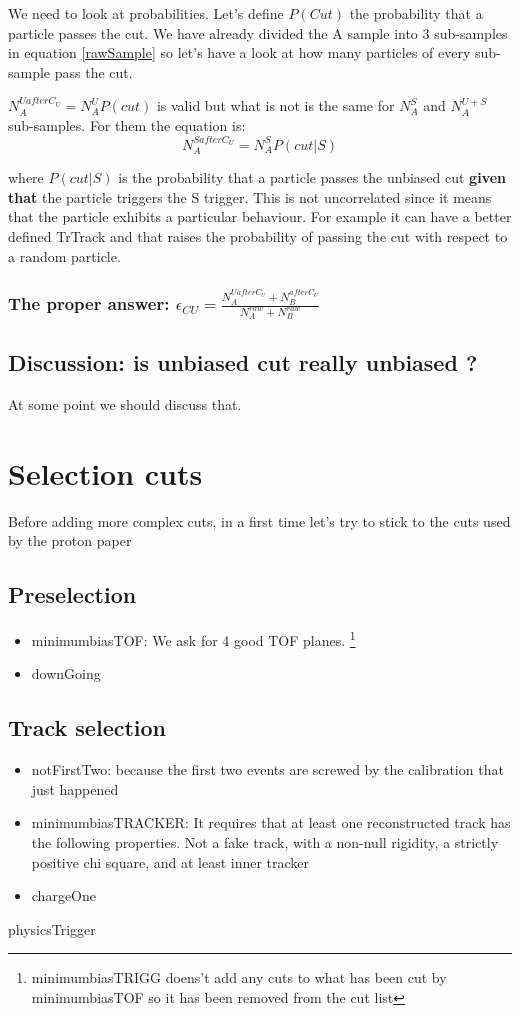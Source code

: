 \documentclass[fleqn,twoside]{article}
\begin{document}
We need to look at probabilities. Let's define $P(Cut)$ the probability that a particle passes the cut.
We have already divided the A sample into 3 sub-samples in equation \ref{rawSample} so let's have a look at how many particles of every sub-sample pass the cut.

$N_{A}^{U after C_{U}} = N_{A}^{U} P(cut)$ is valid but what is not is the same for $N_{A}^{S}$ and $N_{A}^{U+S}$ sub-samples.
For them the equation is:
\begin{equation}
  N_{A}^{S after C_{U}} = N_{A}^{S} P(cut|S)
\end{equation}

where $P(cut|S)$ is the probability that a particle passes the unbiased cut \textbf{given that} the particle triggers the S trigger. This is not uncorrelated since it means that the particle exhibits a particular behaviour. For example it can have a better defined TrTrack and that raises the probability of passing the cut with respect to a random particle.

\subsubsection{The proper answer: $\epsilon_{CU} = \frac{N_{A}^{U after C_{U}} + N_{B}^{after C_{U}}}{N_{A}^{raw} + N_{B}^{raw}}$}

\subsection{Discussion: is unbiased cut really unbiased ?}
At some point we should discuss that.

\section{Selection cuts}
Before adding more complex cuts, in a first time let's try to stick to the cuts used by the proton paper
\subsection{Preselection}
\begin{itemize}
\item minimumbiasTOF: We ask for 4 good TOF planes. 
  \footnote{minimumbiasTRIGG doens't add any cuts to what has been cut by minimumbiasTOF so it has been removed from the cut list}
\item downGoing
\end{itemize}

\subsection{Track selection}
\begin{itemize}
\item notFirstTwo: because the first two events are screwed by the calibration that just happened
\item minimumbiasTRACKER:
  It requires that at least one reconstructed track has the following properties.
  Not a fake track, with a non-null rigidity, a strictly positive chi square, and at least inner tracker
\item chargeOne
\end{itemize}

physicsTrigger


\begin{thebibliography}{99}

\end{thebibliography}
\end{document}
